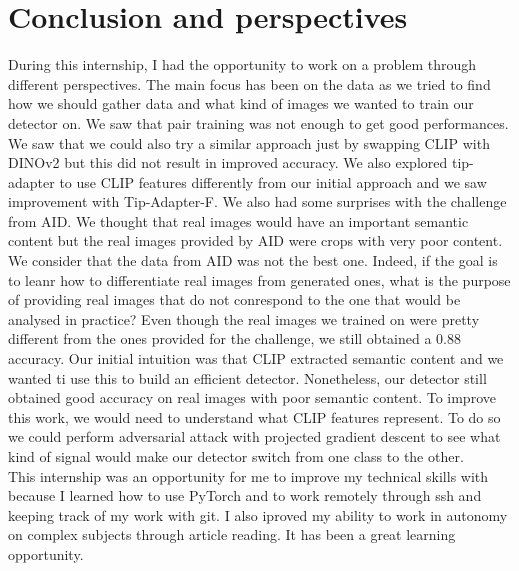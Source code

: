 \documentclass[12pt,a4paper]{article}
\begin{document}
\section{Conclusion and perspectives}
During this internship, I had the opportunity to work on a problem through different perspectives. The main focus has been on the data as we tried to find how we should gather data and what kind of images we wanted to train our detector on. We saw that pair training was not enough to get good performances. We saw that we could also try a similar approach just by swapping CLIP with DINOv2 but this did not result in improved accuracy. We also explored tip-adapter to use CLIP features differently from our initial approach and we saw improvement with Tip-Adapter-F. We also had some surprises with the challenge from AID. We thought that real images would have an important semantic content but the real images provided by AID were crops with very poor content. We consider that the data from AID was not the best one. Indeed, if the goal is to leanr how to differentiate real images from generated ones, what is the purpose of providing real images that do not conrespond to the one that would be analysed in practice? Even though the real images we trained on were pretty different from the ones provided for the challenge, we still obtained a 0.88 accuracy. Our initial intuition was that CLIP extracted semantic content and we wanted ti use this to build an efficient detector. Nonetheless, our detector still obtained good accuracy on real images with poor semantic content.  To improve this work, we would need to understand what CLIP features represent. To do so we could perform adversarial attack with projected gradient descent to see what kind of signal would make our detector switch from one class to the other.\\
This internship was an opportunity for me to improve my technical skills with because I learned how to use PyTorch and to work remotely through ssh and keeping track of my work with git. I also iproved my ability to work in autonomy on complex subjects through article reading. It has been a great learning opportunity.

\newpage
\printbibliography
\end{document}
